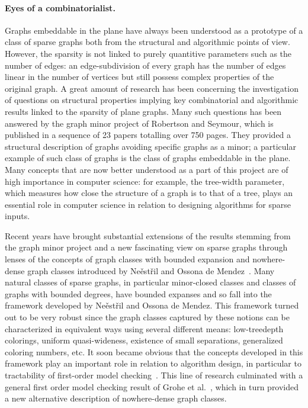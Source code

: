 \paragraph*{Eyes of a combinatorialist.}

Graphs embeddable in the plane have always been understood as a prototype of a class of sparse graphs
both from the structural and algorithmic points of view.
However, the sparsity is not linked to purely quantitive parameters such as the number of edges:
an edge-subdivision of every graph has the number of edges linear in the number of vertices
but still possess complex properties of the original graph.
A great amount of research has been concerning the investigation of questions on structural properties
implying key combinatorial and algorithmic results linked to the sparsity of plane graphs.
Many such questions has been answered by the graph minor project of Robertson and Seymour,
which is published in a sequence of 23 papers totalling over 750 pages.
They provided a structural description of graphs avoiding specific graphs as a minor;
a particular example of such class of graphs is the class of graphs embeddable in the plane.
Many concepts that are now better understood as a part of this project are of high importance in computer science:
for example, the tree-width parameter, which measures how close the structure of a graph is to that of a tree,
plays an essential role in computer science in relation to designing algorithms for sparse inputs.

Recent years have brought substantial extensions of the results stemming from the graph minor project and
a new fascinating view on sparse graphs through lenses of the concepts of graph classes with bounded expansion and
nowhere-dense graph classes introduced by Ne\v est\v ril and Ossona de Mendez~\cite{}.
Many natural classes of sparse graphs, in particular minor-closed classes and classes of graphs with bounded degrees,
have bounded expanses and so fall into the framework developed by Ne\v est\v ril and Ossona de Mendez.
This framework turned out to be very robust since the graph classes captured by these notions
can be characterized in equivalent ways using several different means: low-treedepth colorings,
uniform quasi-wideness, existence of small separations, generalized coloring numbers, etc.
It soon became obvious that the concepts developed in this framework play an important role
in relation to algorithm design, in particular to tractability of first-order model checking~\cite{}.
This line of research culminated with a general first order model checking result of Grohe et al.~\cite{},
which in turn provided a new alternative description of nowhere-dense graph classes.

